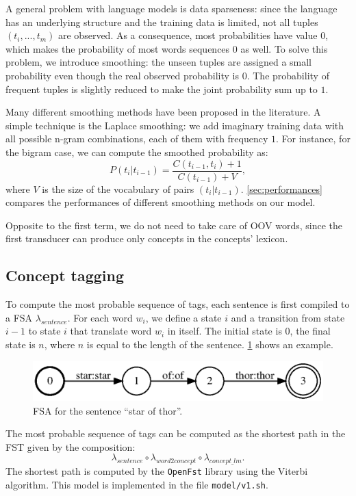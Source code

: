 A general problem with language models is data sparseness:
since the language has an underlying structure and the training data is limited, not all tuples $(t_i, ..., t_m)$ are observed.
As a consequence, most probabilities have value $0$, which makes the probability of most words sequences $0$ as well.
To solve this problem, we introduce smoothing:
the unseen tuples are assigned a small probability even though the real observed probability is $0$.
The probability of frequent tuples is slightly reduced to make the joint probability sum up to $1$.

Many different smoothing methods have been proposed in the literature.
A simple technique is the Laplace smoothing:
we add imaginary training data with all possible n-gram combinations, each of them with frequency $1$.
For instance, for the bigram case, we can compute the smoothed probability as:
\begin{equation*}
    P(t_i | t_{i-1}) = \frac{C(t_{i-1}, t_i) + 1}{C(t_{i-1}) + V},
\end{equation*}
where $V$ is the size of the vocabulary of pairs $(t_i | t_{i-1})$.
\cref{sec:performances} compares the performances of different smoothing methods on our model. 

Opposite to the first term, we do not need to take care of \ac{OOV} words, since the first transducer can produce only concepts in the concepts' lexicon.

\subsection{Concept tagging}
To compute the most probable sequence of tags, each sentence is first compiled to a \ac{FSA} $\lambda_{sentence}$.
For each word $w_i$, we define a state $i$ and a transition from state $i-1$ to state $i$ that translate word $w_i$ in itself.
The initial state is $0$, the final state is $n$, where $n$ is equal to the length of the sentence.
\cref{fig:fsa_sentence} shows an example.

\begin{figure}[h]
	\centering
	\includegraphics[width=0.95\columnwidth]{figures/fsa}
	\caption{\ac{FSA} for the sentence ``star of thor''.}
	\label{fig:fsa_sentence}
\end{figure}

The most probable sequence of tags can be computed as the shortest path in the \ac{FST} given by the composition:
\begin{equation*}
    \lambda_{sentence} \circ \lambda_{word2concept} \circ \lambda_{concept\_lm}.
\end{equation*}
The shortest path is computed by the \texttt{OpenFst} library using the Viterbi algorithm.
This model is implemented in the file \texttt{model/v1.sh}.
